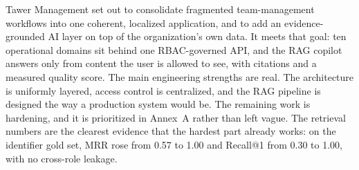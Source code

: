 Tawer Management set out to consolidate fragmented team-management workflows into one coherent, localized
application, and to add an evidence-grounded AI layer on top of the organization's own data. It meets that
goal: ten operational domains sit behind one RBAC-governed API, and the RAG copilot answers only from
content the user is allowed to see, with citations and a measured quality score. The main engineering
strengths are real. The architecture is uniformly layered, access control is centralized, and the RAG
pipeline is designed the way a production system would be. The remaining work is hardening, and it is prioritized in Annex~A
rather than left vague. The retrieval numbers are the clearest evidence that the hardest part already
works: on the identifier gold set, MRR rose from 0.57 to 1.00 and Recall@1 from 0.30 to 1.00, with no
cross-role leakage.
